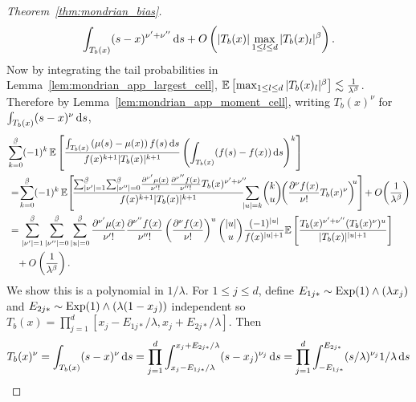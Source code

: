 \begin{proof}[Theorem~\ref{thm:mondrian_bias}]
\begin{align*}
    \int_{T_b(x)} (s-x)^{\nu' + \nu''} \,\mathrm{d}s
    + O \left( |T_b(x)| \max_{1 \leq l \leq d} |T_b(x)_l|^\beta \right).
  \end{align*}
  Now by integrating the tail probabilities in
  Lemma~\ref{lem:mondrian_app_largest_cell},
  $ \mathbb{E} \left[ \max_{1 \leq l \leq d} |T_b(x)_l|^\beta \right]
  \lesssim \frac{1}{\lambda^\beta}$.
  Therefore by Lemma~\ref{lem:mondrian_app_moment_cell},
  writing $T_b(x)^\nu$ for $\int_{T_b(x)} (s-x)^\nu \,\mathrm{d}s$,
  \begin{align*}
    &\sum_{k=0}^{\flbeta}
    (-1)^k \,
    \E \left[
      \frac{\int_{T_b(x)} \left( \mu(s) - \mu(x) \right) f(s) \diff s}
      {f(x)^{k+1} |T_b(x)|^{k+1}}
      \left(
        \int_{T_b(x)} (f(s) - f(x)) \diff s
      \right)^k
    \right] \\
    &\,=
    \! \sum_{k=0}^{\flbeta}
    (-1)^k \,
    \E \!
    \left[
      \! \frac{
        \sum_{|\nu'|=1}^{\flbeta}
        \! \sum_{|\nu''|=0}^{\flbeta}
        \! \frac{\partial^{\nu'} \mu(x)}{\nu' !}
        \frac{\partial^{\nu''} f(x)}{\nu'' !}
        T_b(x)^{\nu' + \nu''\!\!\!}
      }{f(x)^{k+1} |T_b(x)|^{k+1}}
      \!\! \sum_{|u| = k}
      \! \binom{k}{u}
      \!\!
      \left(
        \frac{\partial^\nu f(x)}{\nu !}
        T_b(x)^\nu
      \right)^{\!\! u}
    \right]
    \! + O \! \left(
      \frac{1}{\lambda^\beta}
    \right) \\
    &\,=
    \sum_{|\nu'|=1}^{\flbeta}
    \sum_{|\nu''|=0}^{\flbeta}
    \sum_{|u|=0}^{\flbeta}
    \frac{\partial^{\nu'} \mu(x)}{\nu' !}
    \frac{\partial^{\nu''} f(x)}{\nu'' !}
    \left( \frac{\partial^\nu f(x)}{\nu !} \right)^u
    \binom{|u|}{u}
    \frac{(-1)^{|u|}}{f(x)^{|u|+1}}
    \E \left[
      \frac{ T_b(x)^{\nu' + \nu''} (T_b(x)^\nu)^u}{|T_b(x)|^{|u|+1}}
    \right] \\
    &\quad+
    O \left(
      \frac{1}{\lambda^\beta}
    \right) .
  \end{align*}
  We show this is a polynomial in $1/\lambda$.
  For $1 \leq j \leq d$, define
  $E_{1j*} \sim \operatorname{Exp}(1) \wedge (\lambda x_j)$
  and $E_{2j*} \sim \operatorname{Exp}(1) \wedge (\lambda (1-x_j))$
  independent so
  $T_b(x) = \prod_{j=1}^{d} [x_j - E_{1j*} / \lambda, x_j + E_{2j*} / \lambda]$.
  Then
  \begin{align*}
    T_b(x)^\nu
    &=
    \int_{T_b(x)} (s-x)^\nu \diff s
    = \prod_{j=1}^d
    \int_{x_j - E_{1j*}/\lambda}^{x_j+E_{2j*}/\lambda}
    (s - x_j)^{\nu_j} \diff s
    = \prod_{j=1}^d
    \int_{-E_{1j*}}^{E_{2j*}} (s / \lambda)^{\nu_j} 1/\lambda \diff s \\

\end{align*}
\end{proof}

